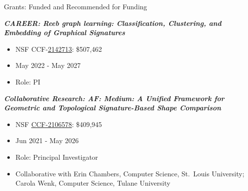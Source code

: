 \documentclass{resume} %
\begin{document}
%



\newpage
\begin{rSection}{Grants: Funded and Recommended for Funding}

\textbf{\textit{CAREER: Reeb graph learning: Classification, Clustering, and Embedding of Graphical Signatures
}}
\vspace{-.1in}
\begin{itemize}{}{\leftmargin=0em}
   \itemsep -0.6em %
   \item NSF CCF-\href{https://nsf.gov/awardsearch/showAward?AWD_ID=2142713}{2142713}:  \$507,462
\item
May 2022 - May 2027
   \item
Role: PI

\end{itemize}



\textbf{\textit{Collaborative Research: AF: Medium: A Unified Framework for Geometric and Topological Signature-Based Shape Comparison}}
\vspace{-.1in}
\begin{itemize}{}{\leftmargin=0em}
   \itemsep -0.6em %
   \item
NSF \href{https://nsf.gov/awardsearch/showAward?AWD_ID=2106578}{CCF-2106578}:  \$409,945
\item
Jun 2021 - May 2026
   \item
Role: Principal Investigator
\item Collaborative with
  Erin Chambers, Computer Science, St.~Louis University; Carola Wenk, Computer Science, Tulane University

\end{itemize}




\end{rSection}
\end{document}
